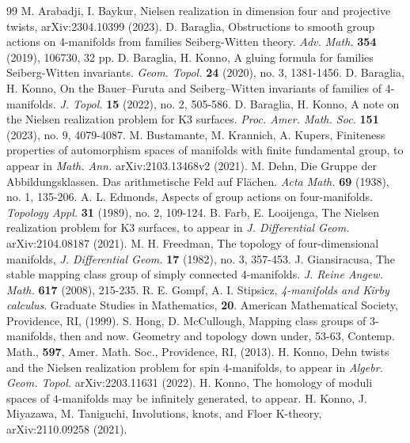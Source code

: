\documentclass{amsart}
\theoremstyle{definition}
\theoremstyle{remark}
\numberwithin{equation}{section}
\begin{document}


\begin{thebibliography}{99}
M. Arabadji, I. Baykur, Nielsen realization in dimension four and projective twists, arXiv:2304.10399 (2023).
D. Baraglia, Obstructions to smooth group actions on 4-manifolds from families Seiberg-Witten theory. {\em Adv. Math.} {\bf 354} (2019), 106730, 32 pp. 
D. Baraglia, H. Konno, A gluing formula for families Seiberg-Witten invariants. {\em Geom. Topol.} {\bf 24} (2020), no. 3, 1381-1456. 
D. Baraglia, H. Konno, On the Bauer--Furuta and Seiberg--Witten invariants of families of 4-manifolds. {\em J. Topol.} {\bf 15} (2022), no. 2, 505-586. 
D. Baraglia, H. Konno, A note on the Nielsen realization problem for K3 surfaces. {\em Proc. Amer. Math. Soc.} {\bf 151} (2023), no. 9, 4079-4087. 
M. Bustamante, M. Krannich, A. Kupers, Finiteness properties of automorphism spaces of manifolds with finite fundamental group, to appear in {\em Math. Ann.} arXiv:2103.13468v2 (2021).
M. Dehn, Die Gruppe der Abbildungsklassen. Das arithmetische Feld auf Fl\"{a}chen. {\em Acta Math.} {\bf 69} (1938), no. 1, 135-206. 
A. L. Edmonds, Aspects of group actions on four-manifolds. {\em Topology Appl.} {\bf 31} (1989), no. 2, 109-124. 
B. Farb, E. Looijenga, The Nielsen realization problem for K3 surfaces, to appear in {\em J. Differential Geom.} arXiv:2104.08187 (2021).
M. H. Freedman, The topology of four-dimensional manifolds, {\em J. Differential Geom.} {\bf 17} (1982), no. 3, 357-453. 
J. Giansiracusa, The stable mapping class group of simply connected 4-manifolds. {\em J. Reine Angew. Math.} {\bf 617} (2008), 215-235. 
R. E. Gompf, A. I. Stipsicz, {\em 4-manifolds and Kirby calculus}. Graduate Studies in Mathematics, {\bf 20}. American Mathematical Society, Providence, RI, (1999).
S. Hong, D. McCullough, Mapping class groups of 3-manifolds, then and now. Geometry and topology down under, 53-63, Contemp. Math., {\bf 597}, Amer. Math. Soc., Providence, RI, (2013). 
H. Konno, Dehn twists and the Nielsen realization problem for spin 4-manifolds, to appear in {\em Algebr. Geom. Topol.} arXiv:2203.11631 (2022).
H. Konno, The homology of moduli spaces of $4$-manifolds may be infinitely generated, to appear.
H. Konno, J. Miyazawa, M. Taniguchi, Involutions, knots, and Floer K-theory, arXiv:2110.09258 (2021).

\end{thebibliography}
\end{document}
